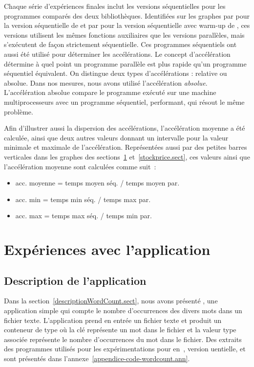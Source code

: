 Chaque s\'erie d'exp\'eriences finales inclut les versions s\'equentielles pour les programmes compar\'es des deux biblioth\`eques. Identifi\'ees sur les graphes par  pour la version s\'equentielle de  et par  pour la version s\'equentielle avec warm-up de , ces versions utilisent les m\^emes fonctions auxiliaires que les versions parall\`eles, mais s'ex\'ecutent de fa\c{c}on strictement s\'equentielle. Ces programmes s\'equentiels ont aussi \'et\'e utilis\'e pour d\'eterminer les acc\'el\'erations. Le concept d'acc\'el\'eration d\'etermine \`a quel point un programme parall\`ele est plus rapide qu'un programme s\'equentiel \'equivalent. On distingue deux types d'acc\'elérations : relative ou absolue. Dans nos mesures, nous avons utilis\'e l'acc\'el\'eration \emph{absolue}. L'acc\'el\'eration absolue compare le programme ex\'ecut\'e sur une machine multiprocesseurs avec un programme s\'equentiel, performant, qui r\'esout le m\^eme probl\`eme. 

Afin d'illustrer aussi la dispersion des acc\'el\'erations, l'accélération moyenne a été calculée, ainsi que deux autres valeurs donnant un intervalle pour la valeur minimale et maximale de l'acc\'el\'eration. Repr\'esent\'ees aussi par des petites barres verticales dans les graphes des sections~\ref{wordcount.sect} et~\ref{stockprice.sect}, ces valeurs ainsi que l'accélération moyenne sont calcul\'ees comme suit~: 

\begin{itemize}
\item acc. moyenne  =  temps moyen séq. / temps moyen par.
\item acc. min  =  temps min séq. / temps max par.
\item acc. max = temps max séq. / temps min par.
\end{itemize}

\section{Expériences avec l'application }
\label{wordcount.sect}



\subsection{Description de l'application }

Dans la section~\ref{descriptionWordCount.sect}, nous avons pr\'esent\'e , une application simple qui compte le nombre d'occurrences des divers mots dans un fichier texte. L'application prend en entr\'ee un fichier texte et produit un conteneur de type  où la cl\'e repr\'esente un mot dans le fichier et la valeur  type   associ\'ee repr\'esente le nombre d'occurrences du mot dans le fichier. Des extraits des programmes utilis\'es pour les exp\'erimentations pour  en~,  version uentielle,  et  sont pr\'esent\'es dans l'annexe~\ref{appendice-code-wordcount.ann}.

